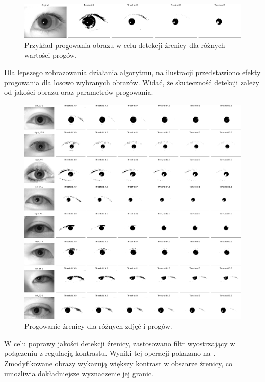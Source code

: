 \documentclass[a4paper]{article}
\begin{document}
\begin{figure}[H]
    \centering
    \includegraphics[width=0.9\linewidth]{figures/pupil_thresholds.png}
    \caption{Przykład progowania obrazu w celu detekcji źrenicy dla różnych wartości progów.}
    \label{fig:pupil_thresholds}
\end{figure}

Dla lepszego zobrazowania działania algorytmu, na ilustracji  przedstawiono efekty progowania dla losowo wybranych obrazów. Widać, że skuteczność detekcji zależy od jakości obrazu oraz parametrów progowania.

\begin{figure}[H]
    \centering
    \includegraphics[width=0.9\linewidth]{figures/pupil_thresholds_many.png}
    \caption{Progowanie źrenicy dla różnych zdjęć i progów.}
    \label{fig:pupil_thresholds_many}
\end{figure}

W celu poprawy jakości detekcji źrenicy, zastosowano filtr wyostrzający w połączeniu z regulacją kontrastu. Wyniki tej operacji pokazano na . Zmodyfikowane obrazy wykazują większy kontrast w obszarze źrenicy, co umożliwia dokładniejsze wyznaczenie jej granic.
\end{document}
